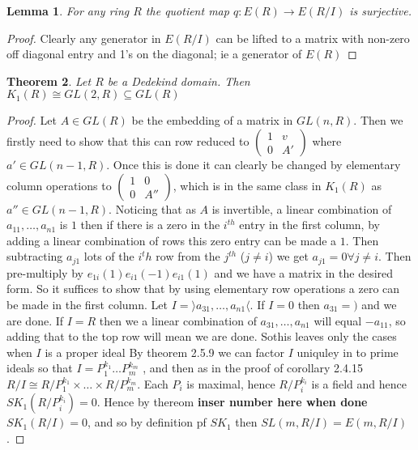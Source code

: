 \documentclass[a4paper,10pt]{article}
\newtheorem{thm}{Theorem}[subsection]
\newtheorem{lem}[thm]{Lemma}
\begin{document}
\begin{lem}
For any ring $R$ the quotient map $q:E(R)\rightarrow E(R/I)$ is surjective.
\end{lem}
\begin{proof}
Clearly any generator in $E(R/I)$ can be lifted to a matrix with non-zero off diagonal entry and 1's on the diagonal; ie a generator of $E(R)$
\end{proof}

\begin{thm}
Let $R$ be a Dedekind domain. Then $K_{1}(R)\cong GL(2,R)\subseteq GL(R)$
\end{thm}
\begin{proof}
Let $A\in GL(R)$ be the embedding of a matrix in $GL(n,R)$. Then we firstly need to show that this can row reduced to $\begin{pmatrix} 1 & v \\ 0 & A' \end{pmatrix}$ where $a'\in GL(n-1,R)$. Once this is done it can clearly be changed by elementary column operations to $\begin{pmatrix} 1 & 0 \\ 0 & A'' \end{pmatrix}$, which is in the same class in $K_{1}(R)$ as $a''\in GL(n-1,R)$.
\newline Noticing that as $A$ is invertible, a linear combination of $a_{11},\ldots ,a_{n1}$ is $1$ then if there is a zero in the $i^{th}$ entry in the first column, by adding a linear combination of rows this zero entry can be made a $1$. Then subtracting $a_{j1}$ lots of the $i^th$ row from the $j^{th}$ ($j\neq i$) we get $a_{j1}=0 \forall j\neq i$. Then pre-multiply by $e_{1i}(1)e_{i1}(-1)e_{i1}(1)$ and we have a matrix in the desired form. So it suffices to show that by using elementary row operations a zero can be made in the first column.
\newline Let $I=\rangle a_{31},\ldots ,a_{n1} \langle$. If $I=0$ then $a_{31}=)$ and we are done. If $I=R$ then we a linear combination of $a_{31},\ldots ,a_{n1}$ will equal $-a_{11}$, so adding that to the top row will mean we are done. Sothis leaves only the cases when $I$ is a proper ideal
\newline By theorem 2.5.9 we can factor $I$ uniquley in to prime ideals so that $I=P_{1}^{k_{1}}\ldots P_{m}^{k_{m}}$ , and then as in the proof of corollary 2.4.15 $R/I\cong R/P_{1}^{k_{1}}\times \ldots \times R/P_{m}^{k_{m}}$. Each $P_{i}$ is maximal, hence $R/P_{i}^{k_{i}}$ is a field and hence $SK_{1}(R/P_{i}^{k_{i}})=0$. Hence by thereom \textbf{inser number here when done} $SK_{1}(R/I)=0$, and so by definition pf $SK_{1}$ then $SL(m,R/I)=E(m,R/I)$.

\end{proof}
\end{document}
